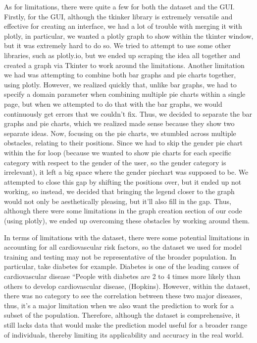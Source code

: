 ﻿\documentclass[12pt]{article}
\begin{document}
As for limitations, there were quite a few for both the dataset and the GUI. Firstly, for the GUI, although the tkinker library is extremely versatile and effective for creating an interface, we had a lot of trouble with merging it with plotly, in particular, we wanted a plotly graph to show within the tkinter window, but it was extremely hard to do so. We tried to attempt to use some other libraries, such as plotly.io, but we ended up scraping the idea all together and created a graph via Tkinter to work around the limitations. Another limitation we had was attempting to combine both bar graphs and pie charts together, using plotly. However, we realized quickly that, unlike bar graphs, we had to specify a domain parameter when combining multiple pie charts within a single page, but when we attempted to do that with the bar graphs, we would continuously get errors that we couldn’t fix. Thus, we decided to separate the bar graphs and pie charts, which we realized made sense because they show two separate ideas. Now, focusing on the pie charts, we stumbled across multiple obstacles, relating to their positions. Since we had to skip the gender pie chart within the for loop (because we wanted to show pie charts for each specific category with respect to the gender of the user, so the gender category is irrelevant), it left a big space where the gender piechart was supposed to be. We attempted to close this gap by shifting the positions over, but it ended up not working, so instead, we decided that bringing the legend closer to the graph would not only be aesthetically pleasing, but it’ll also fill in the gap. Thus, although there were some limitations in the graph creation section of our code (using plotly), we ended up overcoming these obstacles by working around them.

In terms of limitations with the dataset, there were some potential limitations in accounting for all cardiovascular risk factors, so the dataset we used for model training and testing may not be representative of the broader population. In particular, take diabetes for example. Diabetes is one of the leading causes of cardiovascular disease “People with diabetes are 2 to 4 times more likely than others to develop cardiovascular disease, (Hopkins). However, within the dataset, there was no category to see the correlation between these two major diseases, thus, it's a major limitation when we also want the prediction to work for a subset of the population. Therefore, although the dataset is comprehensive, it still lacks data that would make the prediction model useful for a broader range of individuals, thereby limiting its applicability and accuracy in the real world.
\end{document}
